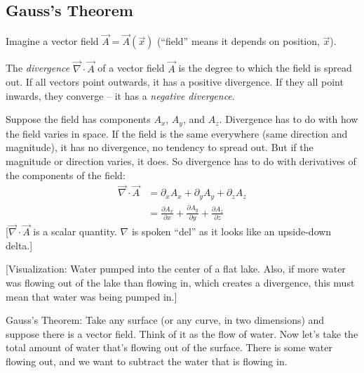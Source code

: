 \documentclass[pagesize,headsepline,10pt,parskip=half,BCOR=12mm]{scrreprt}
\begin{document}
      \subsection{Gauss's Theorem}
        Imagine a vector field $\vec A = \vec A(\vec x)$ (``field''
        means it depends on position, $\vec x$).

        The \emph{divergence} $ \vec \nabla \cdot \vec A$ of a vector
        field $\vec A$ is the degree to which the field is spread
        out.
        If all vectors point outwards, it has a positive divergence. If they all point
        inwards, they converge -- it has a \emph{negative
        divergence}.

        Suppose the field has components $A_x$, $A_y$, and $A_z$.
        Divergence has to do with how the field varies in space. If
        the field is the same everywhere (same direction and
        magnitude), it has no divergence, no tendency to spread out.
        But if the magnitude or direction varies, it does. So
        divergence has to do with derivatives of the components of
        the field:
        \begin{align}
          \vec \nabla \cdot \vec A &= \partial_x A_x + \partial_y
          A_y + \partial_z A_z \\
          &= \frac{\partial A_x}{\partial x} + \frac{\partial
          A_y}{\partial y} + \frac{\partial A_z}{\partial z}
        \end{align}
        [$\vec \nabla \cdot \vec A$ is a scalar quantity. $\nabla$
        is spoken ``del'' as it looks like an upside-down delta.]

        [Visualization: Water pumped into the center of a flat
        lake. Also, if more water was flowing out of the lake than
        flowing in, which creates a divergence, this must mean that
        water was being pumped in.]

        Gauss's Theorem: Take any surface (or any curve, in two
        dimensions) and suppose there is a vector field. Think of
        it as the flow of water.  Now let's take the total amount
        of water that's flowing out of the surface. There is some
        water flowing out, and we want to subtract the water that
        is flowing in.
\end{document}
